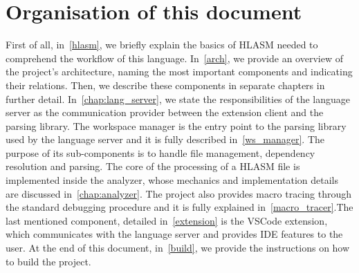 \section{Organisation of this document}
First of all, in~\cref{hlasm}, we briefly explain the basics of HLASM needed to comprehend the workflow of this language. In~\cref{arch}, we provide an overview of the project's architecture, naming the most important components and indicating their relations. Then, we describe these components in separate chapters in further detail. In~\cref{chap:lang_server}, we state the responsibilities of the language server as the communication provider between the extension client and the parsing library. The workspace manager is the entry point to the parsing library used by the language server and it is fully described in~\cref{ws_manager}. The purpose of its sub-components is to handle file management, dependency resolution and parsing. The core of the processing of a HLASM file is implemented inside the analyzer, whose mechanics and implementation details are discussed in~\cref{chap:analyzer}. The project also provides macro tracing through the standard debugging procedure and it is fully explained in~\cref{macro_tracer}.The last mentioned component, detailed in~\cref{extension} is the VSCode extension, which communicates with the language server and provides IDE features to the user. At the end of this document, in~\cref{build}, we provide the instructions on how to build the project.
